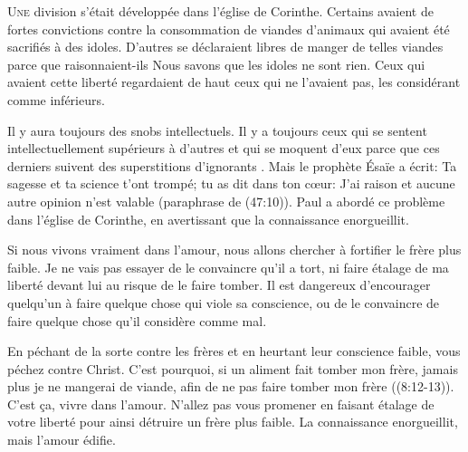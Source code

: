 \dvrule








\lettrine{U}{ne} division s'était développée dans l'église de Corinthe.
 Certains avaient de fortes convictions
 contre la consommation de viandes d'animaux
 qui avaient été sacrifiés à des idoles.
 D'autres se déclaraient libres de manger
 de telles viandes parce que \ocadr raisonnaient-ils \fcadr{}
 \Og Nous savons que les idoles ne sont rien. \Fg{}
 Ceux qui avaient cette liberté regardaient de haut
 ceux qui ne l'avaient pas, les considérant comme inférieurs.

Il y aura toujours des snobs intellectuels.
 Il y a toujours ceux qui se sentent intellectuellement
 supérieurs à d'autres et qui se moquent d'eux
 parce que ces derniers suivent \Og des superstitions d'ignorants \Fg{}.
 Mais le prophète Ésaïe a écrit: 
 \Og Ta sagesse et ta science t'ont trompé;
 tu as dit dans ton c\oe{}ur: 
 \Og J'ai raison et aucune autre opinion n'est valable \Fg{}
 (paraphrase de (47:10)).
 Paul a abordé ce problème dans l'église de Corinthe,
 en avertissant que \Og la connaissance enorgueillit. \Fg{}


Si nous vivons vraiment dans l'amour,
 nous allons chercher à fortifier le frère plus faible.
 Je ne vais pas essayer de le convaincre qu'il a tort,
 ni faire étalage de ma liberté devant lui
 au risque de le faire tomber.
 Il est dangereux d'encourager quelqu'un
 à faire quelque chose qui viole sa conscience,
 ou de le convaincre de faire quelque chose
 qu'il considère comme mal.

\Og En péchant de la sorte contre les frères
 et en heurtant leur conscience faible,
 vous péchez contre Christ.
 C'est pourquoi, si un aliment fait tomber mon frère,
 jamais plus je ne mangerai de viande,
 afin de ne pas faire tomber mon frère \Fg{}
 ((8:12-13)).
 C'est \c{c}a, vivre dans l'amour.
 N'allez pas vous promener en faisant étalage
 de votre liberté pour ainsi détruire un frère plus faible.
 La connaissance enorgueillit, mais l'amour édifie.

